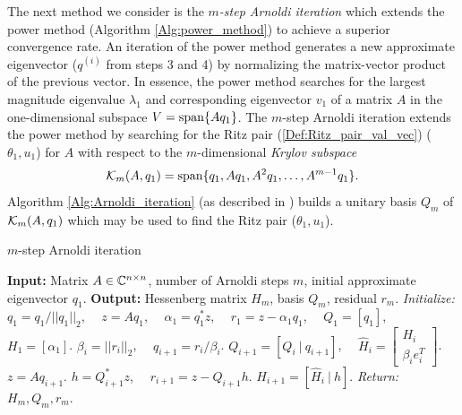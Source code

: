 The next method we consider is the \textit{$m$-step Arnoldi iteration} which extends the power method (Algorithm \ref{Alg:power_method}) to achieve a superior convergence rate.  An iteration of the power method generates a new approximate eigenvector ($q^{(i)}$ from steps 3 and 4) by normalizing the matrix-vector product of the previous vector.  In essence, the power method searches for the largest magnitude eigenvalue $\lambda_1$ and corresponding eigenvector $v_1$ of a matrix $A$ in the one-dimensional subspace $V = \textnormal{span} \{ Aq_1 \}$.  The $m$-step Arnoldi iteration extends the power method by searching for the Ritz pair (\ref{Def:Ritz_pair_val_vec}) ($\theta_1, u_1$) for $A$ with respect to the $m$-dimensional \textit{Krylov subspace}
\begin{equation}
{\mathcal K}_m(A, q_1) = \textnormal{span}\{ q_1, Aq_1, A^2q_1, \ldots, A^{m-1}q_1 \}.
\label{Def:krylov_subspace}
\end{equation}
Algorithm \ref{Alg:Arnoldi_iteration} (as described in \cite[Algorithm 10.5.1]{golub2012matrix}) builds a unitary basis $Q_m$ of ${\mathcal K}_m(A, q_1)$ which may be used to find the Ritz pair ($\theta_1, u_1$).
\begin{algorithm}[H]
\caption{$m$-step Arnoldi iteration}	\label{Alg:Arnoldi_iteration}

\begin{algorithmic}[1]
	\Statex		\textbf{Input:} Matrix $A \in {\mathbb C}^{n \times n}$, number of Arnoldi steps $m$, initial approximate eigenvector $q_1$.
	\Statex 	\textbf{Output:} Hessenberg matrix $H_m$, basis $Q_m$, residual $r_m$.
	\State		\textit{Initialize:} $q_1  = q_1 / ||q_1||_2$, \ \ $z = Aq_1$, \ \ $\alpha_1 = q_1^*z$, \ \ $r_1 = z - \alpha_1 q_1$, \ \ $Q_1 = [q_1]$, \ \ $H_1 = [\alpha_1]$.
		\State	$\beta_i = ||r_i||_2$, \ \ $q_{i+1} = r_i / \beta_i$.
		\State	$Q_{i+1} = [Q_i \ | \ q_{i+1}]$, \ \ $\hat{H}_i = \begin{bmatrix}	H_i \\  \beta_i e_i^T	\end{bmatrix}$.
		\State	$z = Aq_{i+1}$.
		\State	$h = Q_{i+1}^*z$, \ \  $r_{i+1} = z - Q_{i+1}h$.
		\State	$H_{i+1} = [\hat{H}_i \ | \ h]$.
	\EndFor
	\State		\textit{Return:} $H_m, Q_m, r_m$.
\end{algorithmic}

\end{algorithm}

